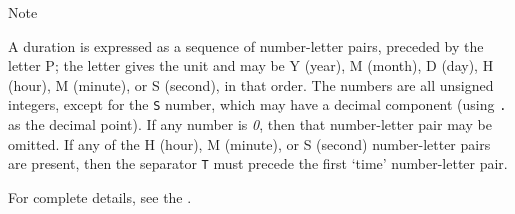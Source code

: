 \begin{reflist}
    \item[{Note}]
  \par
A duration is expressed as a sequence of number-letter pairs, preceded by the letter P; the letter gives the unit and may be Y (year), M (month), D (day), H (hour), M (minute), or S (second), in that order. The numbers are all unsigned integers, except for the \texttt{S} number, which may have a decimal component (using \texttt{.} as the decimal point). If any number is \textit{0}, then that number-letter pair may be omitted. If any of the H (hour), M (minute), or S (second) number-letter pairs are present, then the separator \texttt{T} must precede the first ‘time’ number-letter pair.\par
For complete details, see the .
\end{reflist}  
